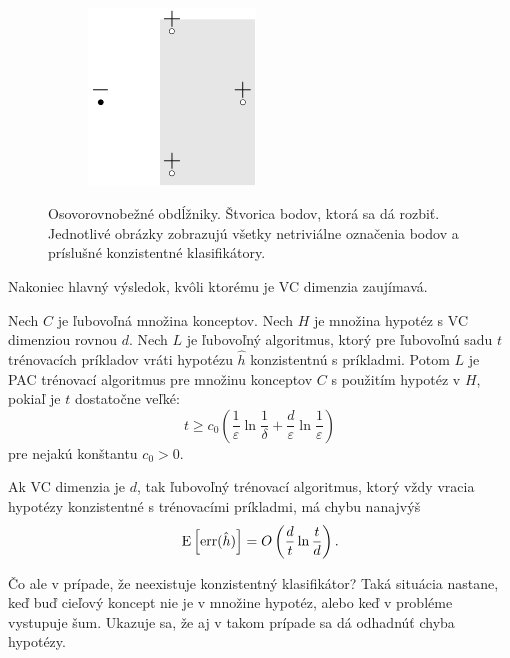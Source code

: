 \begin{figure}
\begin{subfigure}[b]{0.23\linewidth}
    \caption{}
  \end{subfigure}
  ~
  \centering
  \begin{subfigure}[b]{0.23\linewidth}
    \centering
    \includegraphics[scale=1]{obrazky/vc_rect4.pdf}
    \caption{}
  \end{subfigure}
  \caption{Osovorovnobežné obdĺžniky. Štvorica bodov, ktorá sa dá rozbiť.
    Jednotlivé obrázky zobrazujú všetky netriviálne označenia bodov a
    príslušné konzistentné klasifikátory.}
  \label{vc:rect}
\end{figure}

\medskip

Nakoniec hlavný výsledok, kvôli ktorému je VC dimenzia zaujímavá.

\begin{theorem}
  Nech $C$ je ľubovoľná množina konceptov. Nech $H$ je množina hypotéz
  s VC dimenziou rovnou $d$. Nech $L$ je ľubovoľný algoritmus, ktorý
  pre ľubovoľnú sadu $t$ trénovacích príkladov vráti hypotézu $\hat{h}$
  konzistentnú s príkladmi. Potom $L$ je PAC trénovací algoritmus pre
  množinu konceptov $C$ s použitím hypotéz v $H$, pokiaľ je $t$
  dostatočne veľké:
  $$ t \geq c_0 \left( \frac{1}{\varepsilon} \ln{\frac{1}{\delta}} + \frac{d}{\varepsilon} \ln{\frac{1}{\varepsilon}} \right) $$
  pre nejakú konštantu $c_0 > 0$.
\end{theorem}


\begin{theorem}
  Ak VC dimenzia je $d$, tak ľubovoľný trénovací algoritmus, ktorý vždy
  vracia hypotézy konzistentné s trénovacími príkladmi, má chybu nanajvýš
  $$ \operatorname*{\mathrm{E}} \left[ \mathrm{err}(\hat{h}) \right] = O\left( \frac{d}{t} \ln{\frac{t}{d}} \right). $$
\end{theorem}


Čo ale v prípade, že neexistuje konzistentný klasifikátor? Taká situácia
nastane, keď buď cieľový koncept nie je v množine hypotéz, alebo keď v
probléme vystupuje šum. Ukazuje sa, že aj v takom prípade sa dá
odhadnúť chyba hypotézy.

